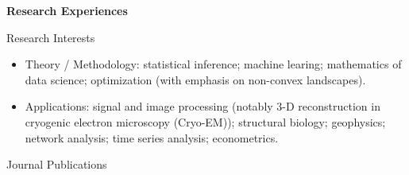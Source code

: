 \documentclass{article}
\begin{document}

\vspace{5mm}
\begin{large}
\noindent \textbf{Research Experiences}
\end{large}
\vspace{5mm}

\begin{large}
\noindent Research Interests
\end{large}



\begin{itemize}

\item Theory / Methodology: statistical inference; machine learing; mathematics of data science; optimization (with emphasis on non-convex landscapes).

\item Applications: signal and image processing (notably 3-D reconstruction in cryogenic electron microscopy (Cryo-EM)); structural biology; geophysics; network analysis; time series analysis; econometrics.

\end{itemize}

\vspace{3mm}

\begin{large}
\noindent Journal Publications
\end{large}
\end{document}
